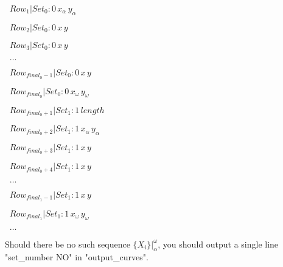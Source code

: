 \documentclass{article}
\begin{document}
$\;\;Row_1 | Set_0:0\, x_\alpha\, y_\alpha$

$\;\;Row_2 | Set_0:0\, x\, y$

$\;\;Row_3 | Set_0:0\, x\, y$

$\;\;\ldots$

$\;\;Row_{{final}_0-1} | Set_0:0\, x\, y$

$\;\;Row_{{final}_0} | Set_0:0\, x_\omega\, y_\omega$

$\;\;Row_{{final}_0+1} | Set_1:1\, length$

$\;\;Row_{{final}_0+2} | Set_1:1\, x_\alpha\, y_\alpha$

$\;\;Row_{{final}_0+3} | Set_1:1\, x\, y$

$\;\;Row_{{final}_0+4} | Set_1:1\, x\, y$

$\;\;\ldots$

$\;\;Row_{{final}_1-1} | Set_1:1\, x\, y$

$\;\;Row_{{final}_1} | Set_1:1\, x_\omega\, y_\omega$

$\;\;\ldots$

Should there be no such sequence $\{X_i\}|_\alpha^\omega$, you should output a single line "set\_number NO" in "output\_curves".
\end{document}
